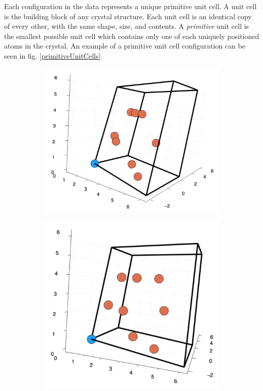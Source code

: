 \par Each configuration in the data represents a unique primitive unit cell. A unit cell is the building block of any crystal structure. Each unit cell is an identical copy of every other, with the same shape, size, and contents. A \textit{primitive} unit cell is the smallest possible unit cell which contains only one of each uniquely positioned atoms in the crystal\cite{solidStateBook}. An example of a primitive unit cell configuration can be seen in fig. \ref{primitiveUnitCells}.

\begin{figure}
  \centering
  \begin{subfigure}{0.53\textwidth}
    \includegraphics[width=\linewidth]{Figures/primitiveCell1}
    \label{primitiveFirst}
  \end{subfigure}%
  \hspace*{\fill}   %
  \begin{subfigure}{0.49\textwidth}
    \includegraphics[width=\linewidth]{Figures/primitiveCell2}

\end{subfigure}
\end{figure}
